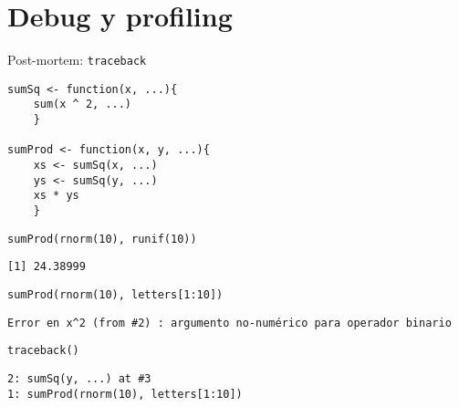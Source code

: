 \documentclass[xcolor={usenames,svgnames,dvipsnames}]{beamer}
\begin{document}
\section{Debug y profiling}
\label{sec-3}

\begin{frame}[fragile,label=sec-3-1]{Post-mortem: \texttt{traceback}}
 \lstset{language=R,numbers=none}
\begin{lstlisting}
sumSq <- function(x, ...){
    sum(x ^ 2, ...)
    }

sumProd <- function(x, y, ...){
    xs <- sumSq(x, ...)
    ys <- sumSq(y, ...)
    xs * ys
    }
\end{lstlisting}

\lstset{language=R,numbers=none}
\begin{lstlisting}
sumProd(rnorm(10), runif(10))
\end{lstlisting}

\begin{verbatim}
[1] 24.38999
\end{verbatim}

\lstset{language=R,numbers=none}
\begin{lstlisting}
sumProd(rnorm(10), letters[1:10])
\end{lstlisting}

\begin{verbatim}
Error en x^2 (from #2) : argumento no-numérico para operador binario
\end{verbatim}

\lstset{language=R,numbers=none}
\begin{lstlisting}
traceback()
\end{lstlisting}

\begin{verbatim}
2: sumSq(y, ...) at #3
1: sumProd(rnorm(10), letters[1:10])
\end{verbatim}
\end{frame}
\end{document}
